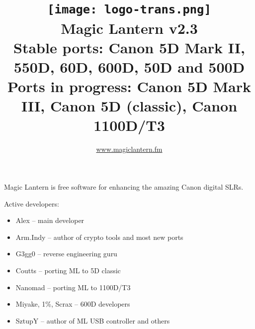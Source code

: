 \documentclass[a4paper,english]{article}
\begin{document}
\title{\vspace{-1cm}\texttt{[image: logo-trans.png]}\\Magic Lantern v2.3\\{\small \vskip1mm Stable ports: Canon 5D Mark II, 550D, 60D, 600D, 50D and 500D \\\vskip-3mm \scriptsize Ports in progress: Canon 5D Mark III, Canon 5D (classic), Canon 1100D/T3 }}
\author{\url{www.magiclantern.fm}}
\maketitle



Magic Lantern is free software for enhancing the amazing Canon digital SLRs.
\vspace{3mm}

Active developers:
\begin{itemize}
\item Alex -- main developer
\item Arm.Indy -- author of crypto tools and most new ports
\item G3gg0 -- reverse engineering guru
\item Coutts -- porting ML to 5D classic
\item Nanomad -- porting ML to 1100D/T3
\item Miyake, 1\%, Scrax -- 600D developers
\item SztupY -- author of ML USB controller and others
\end{itemize}
\end{document}
